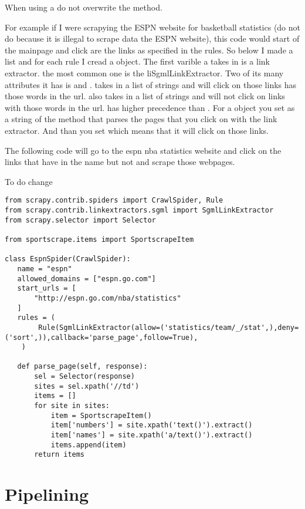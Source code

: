 \begin{warn}
When using a  do not overwrite the  method.
\end{warn}

For example if I were scrapying the ESPN website for basketball statistics (do not do because it is illegal to scrape data the ESPN website), this code would start of the mainpage and click are the links as specified in the rules. So below I made a list and for each rule I cread a  object. The first varible a takes in is a link extractor. the most common one is the li{SgmlLinkExtractor}. Two of its many attributes it has is  and .  takes in a list of strings and will click on those links has those words in the url.  also takes in a list of strings and will not click on links with those words in the url.  has higher precedence than . For a  object you set  as a string of the method that parses the pages that you click on with the link extractor.  And than you set  which means that it will click on those links.

The following code will go to the espn nba statistics website and click on the links that have  in the name but not  and scrape those webpages.

To do change
\begin{lstlisting}
from scrapy.contrib.spiders import CrawlSpider, Rule
from scrapy.contrib.linkextractors.sgml import SgmlLinkExtractor
from scrapy.selector import Selector

from sportscrape.items import SportscrapeItem

class EspnSpider(CrawlSpider):
   name = "espn"
   allowed_domains = ["espn.go.com"]
   start_urls = [
       "http://espn.go.com/nba/statistics"
   ]
   rules = (
        Rule(SgmlLinkExtractor(allow=('statistics/team/_/stat',),deny=('sort',)),callback='parse_page',follow=True),
    )

   def parse_page(self, response):
       sel = Selector(response)
       sites = sel.xpath('//td')
       items = []
       for site in sites:
           item = SportscrapeItem()
           item['numbers'] = site.xpath('text()').extract()
           item['names'] = site.xpath('a/text()').extract()
           items.append(item)
       return items
\end{lstlisting}

\section*{Pipelining}

